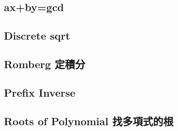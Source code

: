\documentclass[a4paper,10pt,twocolumn,oneside]{article}
\begin{document}
% 

\subsection{ax+by=gcd}


\subsection{Discrete sqrt}


% 

\subsection{Romberg 定積分}


%

\subsection{Prefix Inverse}


\subsection{Roots of Polynomial 找多項式的根}


% 

%
\end{document}
